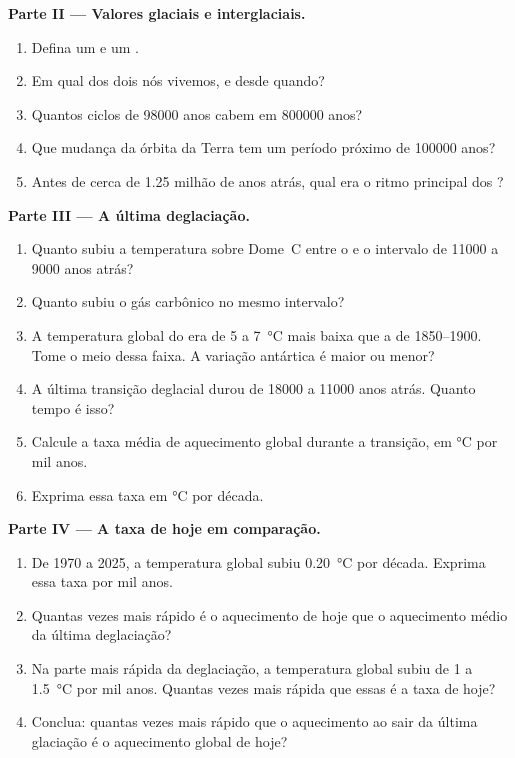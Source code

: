 \begin{problem}
\medskip
\noindent\textbf{Parte II --- Valores glaciais e interglaciais.}
\begin{enumerate}[resume]
  \item Defina um  e um .
  \item Em qual dos dois nós vivemos, e desde quando?
  \item Quantos ciclos de \num{98000} anos cabem em \num{800000} anos?
  \item Que mudança da órbita da Terra tem um período próximo de
        \num{100000} anos?
  \item Antes de cerca de 1.25 milhão de anos atrás, qual era o ritmo
        principal dos ?
\end{enumerate}

\medskip
\noindent\textbf{Parte III --- A última deglaciação.}
\begin{enumerate}[resume]
  \item Quanto subiu a temperatura sobre Dome~C entre o  e o intervalo de \num{11000} a \num{9000} anos atrás?
  \item Quanto subiu o gás carbônico no mesmo intervalo?
  \item A temperatura global do  era de 5 a
        \qty{7}{\degreeCelsius} mais baixa que a de 1850--1900. Tome o meio
        dessa faixa. A variação antártica é maior ou menor?
  \item A última transição deglacial durou de \num{18000} a
        \num{11000} anos atrás. Quanto tempo é isso?
  \item Calcule a taxa média de aquecimento global durante a transição, em
        \unit{\degreeCelsius} por mil anos.
  \item Exprima essa taxa em \unit{\degreeCelsius} por década.
\end{enumerate}

\medskip
\noindent\textbf{Parte IV --- A taxa de hoje em comparação.}
\begin{enumerate}[resume]
  \item De 1970 a 2025, a temperatura global subiu
        \qty{0.20}{\degreeCelsius} por década. Exprima essa taxa por mil
        anos.
  \item Quantas vezes mais rápido é o aquecimento de hoje que o aquecimento
        médio da última deglaciação?
  \item Na parte mais rápida da deglaciação, a temperatura global subiu
        de 1 a \qty{1.5}{\degreeCelsius} por mil anos. Quantas vezes mais
        rápida que essas é a taxa de hoje?
  \item Conclua: quantas vezes mais rápido que o aquecimento ao sair da
        última glaciação é o aquecimento global de hoje?
\end{enumerate}
\end{problem}
